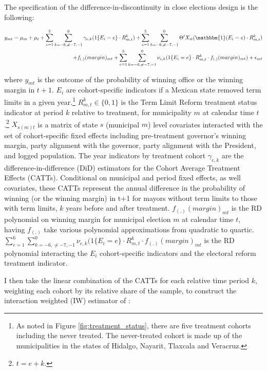\documentclass[12pt]{amsart}
\numberwithin{equation}{section}
\theoremstyle{definition}
\theoremstyle{definition}
\theoremstyle{definition}
\begin{document}
The specification of the difference-in-discontinuity in close elections design is the following:

\begin{equation}
\begin{split}
\label{eq:abraham}
y_{mt}=\mu_m + \mu_t + \sum^5_{e=1} \sum^0_{k=-6, \neq {-7,-1}} \gamma_{e,k}(1\{E_i=e\} \cdot R^k_{m,t}) + \sum^5_{e=1} \sum^0_{k=-6, \neq {-7,-1}}  \Theta'X_{it} (\mathbbm{1}(E_i=e)\cdot R^k_{m,t})  \\
+ f_{(.)}(margin)_{mt} + \sum^5_{e=1} \sum^0_{k=-6, \neq {-7,-1}} \nu_{e,k}(1\{E_i=e\} \cdot R^k_{m,t} \cdot  f_{(.)}(margin)_{mt} )+ \epsilon_{mt}
\end{split}
\end{equation}   

where $y_{mt}$ is the outcome of the probability of winning office or the winning margin in $t+1$. $E_i$ are cohort-specific indicators if a Mexican state removed term limits in a given year.\footnote{As noted in Figure \ref{fig:treatment_status}, there are five treatment cohorts including the never treated. The never-treated cohort is made up of the municipalities in the states of Hidalgo, Nayarit, Tlaxcala and Veracruz.} $R^k_{m,t}\in \{0,1\}$  is the Term Limit Reform treatment status indicator at period $k$ relative to treatment, for municipality $m$ at calendar time $t$.\footnote{$t=e+k$.} $X_{s(m)t}$ is a matrix of state $s$ (municipal $m$) level covariates interacted with the set of cohort-specific fixed effects including pre-treatment governor's winning margin, party alignment with the governor, party alignment with the President, and logged population.  The year indicators by treatment cohort  $\gamma_{e,k}$ are the difference-in-difference (DiD) estimators for the Cohort Average Treatment Effects (CATTs). Conditional on municipal and period fixed effects, as well covariates, these CATTs represent the annual difference in the probability of winning (or the winning margin) in t+1 for mayors without term limits to those with term limits, $k$ years before and after treatment. $f_{(.)}(margin)_{mt}$ is the RD polynomial on winning margin for municipal election $m$ at calendar time $t$, having $f_{(.)}$ take various polynomial approximations from quadratic to quartic. $\sum^6_{e=1} \sum^{0}_{k=-6, \neq {-7,-1}} \nu_{e,k}(1\{E_i=e\} \cdot R^k_{m,t} \cdot  f_{(.)}(margin)_{mt}  $ is the RD polynomial interacting the $E_i$ cohort-specific indicators and the electoral reform treatment indicator. 

I then take the linear combination of the CATTs for each relative time period $k$, weighting each cohort by its relative share of the sample, to construct the interaction weighted (IW) estimator of \citet{abraham_sun_2020}:   
\end{document}

